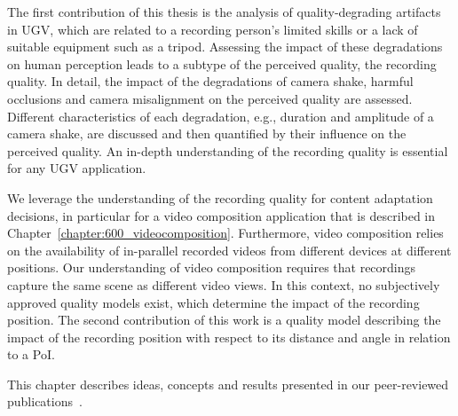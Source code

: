 The first contribution of this thesis is the analysis of quality-degrading artifacts in \ac{UGV}, which are related to a recording person's limited skills or a lack of suitable equipment such as a tripod.
Assessing the impact of these degradations on human perception leads to a subtype of the perceived quality, the recording quality.
In detail, the impact of the degradations of camera shake, harmful occlusions and camera misalignment on the perceived quality are assessed.
Different characteristics of each degradation, e.g., duration and amplitude of a camera shake, are discussed and then quantified by their influence on the perceived quality. 
An in-depth understanding of the recording quality is essential for any \ac{UGV} application.

We leverage the understanding of the recording quality for content adaptation decisions, in particular for a video composition application that is described in Chapter~\ref{chapter:600_videocomposition}.
Furthermore, video composition relies on the availability of in-parallel recorded videos from different devices at different positions.
Our understanding of video composition requires that recordings capture the same scene as different video views.
In this context, no subjectively approved quality models exist, which determine the impact of the recording position.
The second contribution of this work is a quality model describing the impact of the recording position with respect to its distance and angle in relation to a \ac{PoI}.

This chapter describes ideas, concepts and results presented in our peer-reviewed publications~\cite{Wilk2013,Wilk2014b,Wilk2014}.